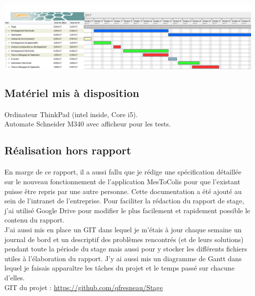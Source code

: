 \documentclass[a4paper,12pt]{extarticle}
\begin{document}
			\centerline{\includegraphics[scale=0.4]{DiagrammeDeGantt}}
	
	\subsection{Matériel mis à disposition}
		\paragraph{}
			
	Ordinateur ThinkPad (intel inside, Core i5).\\
Automate Schneider M340 avec afficheur pour les tests.\\
	
	\subsection{Réalisation hors rapport}
		\paragraph{}

	En marge de ce rapport, il a aussi fallu que je rédige une spécification détaillée sur le nouveau fonctionnement de l’application MesToColis pour que l'existant puisse être repris par une autre personne. Cette documentation a été ajouté au sein de l’intranet de l’entreprise.
Pour faciliter la rédaction du rapport de stage, j’ai utilisé Google Drive pour modifier le plus facilement et rapidement possible le contenu du rapport.\\
J’ai aussi mis en place un GIT dans lequel je m’étais à jour chaque semaine un journal de bord et un descriptif des problèmes rencontrés (et de leurs solutions) pendant toute la période du stage mais aussi pour y stocker les différents fichiers utiles à l’élaboration du rapport. J’y ai aussi mis un diagramme de Gantt dans lequel je faisais apparaître les tâches du projet et le temps passé sur chacune d'elles.\\
GIT du projet : \url{https://github.com/qfresneau/Stage}\\
\end{document}
